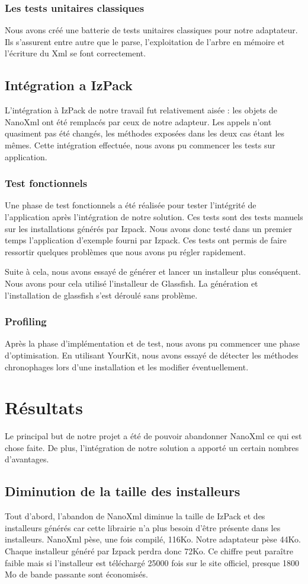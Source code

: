 \subsubsection{Les tests unitaires classiques}
Nous avons créé une batterie de tests unitaires classiques pour notre adaptateur.
Ils s'assurent entre autre que le parse, l'exploitation de l'arbre en mémoire et l'écriture du Xml se font correctement.
\subsection{Intégration a IzPack}
L'intégration à IzPack de notre travail fut relativement aisée : les objets de NanoXml ont été remplacés par ceux de notre adapteur.
Les appels n'ont quasiment pas été changés, les méthodes exposées dans les deux cas étant les mêmes.
Cette intégration effectuée, nous avons pu commencer les tests sur application.
\subsubsection{Test fonctionnels}
Une phase de test fonctionnels a été réalisée pour tester l'intégrité de l'application après l'intégration de notre solution.
Ces tests sont des tests manuels sur les installations générés par Izpack.
Nous avons donc testé dans un premier temps l'application d'exemple fourni par Izpack.
Ces tests ont permis de faire ressortir quelques problèmes que nous avons pu régler rapidement.

Suite à cela, nous avons essayé de générer et lancer un installeur plus conséquent.
Nous avons pour cela utilisé l'installeur de Glassfish.
La génération et l'installation de glassfish s'est déroulé sans problème.
\subsubsection{Profiling}
Après la phase d'implémentation et de test, nous avons pu commencer une phase d'optimisation.
En utilisant YourKit, nous avons essayé de détecter les méthodes chronophages lors d'une installation et les modifier éventuellement.

\section{Résultats}
Le principal but de notre projet a été de pouvoir abandonner NanoXml ce qui est chose faite.
De plus, l'intégration de notre solution a apporté un certain nombres d'avantages.
\subsection{Diminution de la taille des installeurs}
Tout d'abord, l'abandon de NanoXml diminue la taille de IzPack et des installeurs générés car cette librairie n'a plus besoin d'être présente dans les installeurs.
NanoXml pèse, une fois compilé, 116Ko.
Notre adaptateur pèse 44Ko.
Chaque installeur généré par Izpack perdra donc 72Ko.
Ce chiffre peut paraître faible mais si l'installeur est téléchargé 25000 fois sur le site officiel, presque 1800 Mo de bande passante sont économisés.
